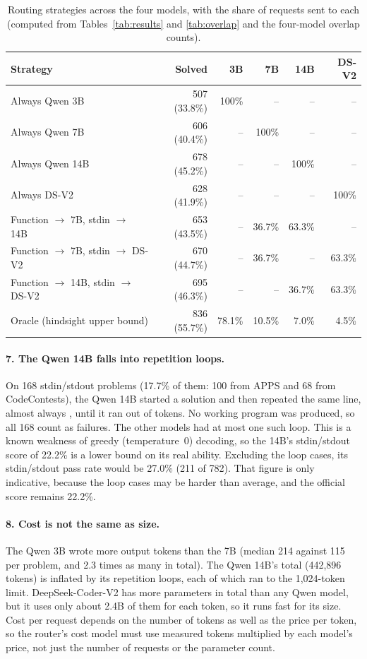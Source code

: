 \begin{table}[!htbp]
\centering
\small
\setlength{\tabcolsep}{4pt}
\begin{tabular}{|l|r|r|r|r|r|}
\hline
\textbf{Strategy} & \textbf{Solved} & \textbf{3B} & \textbf{7B} & \textbf{14B} & \textbf{DS-V2}\\
\hline
Always Qwen 3B & 507 (33.8\%) & 100\% & -- & -- & --\\
Always Qwen 7B & 606 (40.4\%) & -- & 100\% & -- & --\\
Always Qwen 14B & 678 (45.2\%) & -- & -- & 100\% & --\\
Always DS-V2 & 628 (41.9\%) & -- & -- & -- & 100\%\\
Function $\rightarrow$ 7B, stdin $\rightarrow$ 14B & 653 (43.5\%) & -- & 36.7\% & 63.3\% & --\\
Function $\rightarrow$ 7B, stdin $\rightarrow$ DS-V2 & 670 (44.7\%) & -- & 36.7\% & -- & 63.3\%\\
Function $\rightarrow$ 14B, stdin $\rightarrow$ DS-V2 & 695 (46.3\%) & -- & -- & 36.7\% & 63.3\%\\
Oracle (hindsight upper bound) & 836 (55.7\%) & 78.1\% & 10.5\% & 7.0\% & 4.5\%\\
\hline
\end{tabular}
\caption{Routing strategies across the four models, with the share of requests sent to each (computed from Tables~\ref{tab:results} and \ref{tab:overlap} and the four-model overlap counts).}
\label{tab:rule}
\end{table}

\paragraph{7. The Qwen 14B falls into repetition loops.} On 168 stdin/stdout problems (17.7\% of them: 100 from APPS and 68 from CodeContests), the Qwen 14B started a solution and then repeated the same line, almost always , until it ran out of tokens. No working program was produced, so all 168 count as failures. The other models had at most one such loop. This is a known weakness of greedy (temperature~0) decoding, so the 14B's stdin/stdout score of 22.2\% is a lower bound on its real ability. Excluding the loop cases, its stdin/stdout pass rate would be 27.0\% (211 of 782). That figure is only indicative, because the loop cases may be harder than average, and the official score remains 22.2\%.

\paragraph{8. Cost is not the same as size.} The Qwen 3B wrote more output tokens than the 7B (median 214 against 115 per problem, and 2.3 times as many in total). The Qwen 14B's total (442,896 tokens) is inflated by its repetition loops, each of which ran to the 1,024-token limit. DeepSeek-Coder-V2 has more parameters in total than any Qwen model, but it uses only about 2.4B of them for each token, so it runs fast for its size. Cost per request depends on the number of tokens as well as the price per token, so the router's cost model must use measured tokens multiplied by each model's price, not just the number of requests or the parameter count.

